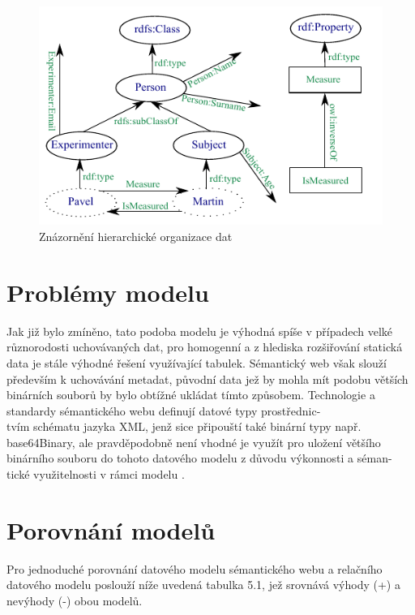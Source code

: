 \documentclass{projekt}
\begin{document}
\begin{figure}[htb]
\begin{center}
\includegraphics[scale=1.6]{miniportal.pdf}
\caption{Znázornění hierarchické organizace dat}
\end{center}
\end{figure}

\section{Problémy modelu}
\hspace{0.65cm}Jak již bylo zmíněno, tato podoba modelu je výhodná spíše v případech velké různorodosti uchovávaných dat, pro homogenní a z hlediska rozšiřování statická data je stále výhodné řešení využívající tabulek. Sémantický web však slouží především k uchovávání metadat, původní data jež by mohla mít podobu větších binárních souborů by bylo obtížné ukládat tímto způsobem. Technologie a standardy sémantického webu definují datové typy prostřednic-\\tvím schématu jazyka XML, jenž sice připouští také binární typy např. base64Binary, ale pravděpodobně není vhodné je využít pro uložení většího binárního souboru do tohoto datového modelu z důvodu výkonnosti a séman-\\tické využitelnosti v rámci modelu \cite{_27}.


\section{Porovnání modelů}
\hspace{0.65cm}Pro jednoduché porovnání datového modelu sémantického webu a relačního datového modelu poslouží níže uvedená tabulka 5.1, jež srovnává výhody (+) a nevýhody (-) obou modelů.
\end{document}
